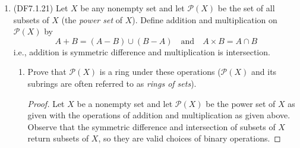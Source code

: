 \documentclass[11pt]{article}
\begin{document}
\begin{enumerate}
\begin{enumerate}[label=\textbf{(\alph*)}]
\begin{proof}
            Hence $\overline{a}\in\mathbb{Z}/n\mathbb{Z}$ is nilpotent if and only if every prime divisor of $n$ is also a divisor of $a$.
        \end{proof}

        In $\mathbb{Z}/72\mathbb{Z} = \mathbb{Z}/2^33^2\mathbb{Z}$ it follows that every nilpotent element is of the form $\overline{2^i3^ja}$ for positive integers $i,j, a$, since $2$ and $3$ divide $2^i3^j$. Explicitly, these are the elements whose integer representative is even and divisible by three: 
        \[
            \overline{0}, \overline{6}, \overline{12}, \overline{18}, \overline{24}, \overline{30}, \overline{36}, \overline{42}, \overline{48}, \overline{54}, \overline{60}, \overline{66}
        \]
        \item Let $R$ be the ring of functions from a nonempty set $X$ to a field $F$. Prove that $R$ contains no nonzero nilpotent elements.
        \begin{proof}
            Let $R$ be the ring of functions from a nonempty set $X$ to a field $F$ as given. Suppose by way of contradiction that $R$ contains a nonzero nilpotent element $g$. 
            
            Because $g$ is a nilpotent element of $R$, there exists a positive integer $k$ such that $g^k$ is the zero function $0_R\colon X\to F$ with $0_R(x) = 0_F$ for all $x\in X$.

            We have that $g$ is not the zero function $0_R$, so that there exists $y\in X$ such that $g(y)\neq 0_F$. Then $g^k(y) = [g(y)]^k = 0_F$. But $g(y)\neq 0_F$ so that $F$ contains a nonzero zero divisor, which is a contradiction.

            Hence $R$ does not contain a nonzero nilpotent element $g$.
        \end{proof}
    \end{enumerate}
    \item (DF7.1.21) Let $X$ be any nonempty set and let $\mathcal{P}(X)$ be the set of all subsets of $X$ (the \textit{power set} of $X$). Define addition and multiplication on $\mathcal{P}(X)$ by \[A+B = (A-B)\cup (B-A)\quad \text{and} \quad A\times B = A\cap B\] i.e., addition is symmetric difference and multiplication is intersection. \begin{enumerate}[label=\textbf{(\alph*)}]
        \item Prove that $\mathcal{P}(X)$ is a ring under these operations ($\mathcal{P}(X)$ and its subrings are often referred to as \textit{rings of sets}).
        \begin{proof}
            Let $X$ be a nonempty set and let $\mathcal{P}(X)$ be the power set of $X$ as given with the operations of addition and multiplication as given above. Observe that the symmetric difference and intersection of subsets of $X$ return subsets of $X$, so they are valid choices of binary operations.


\end{proof}
\end{enumerate}
\end{enumerate}
\end{document}

